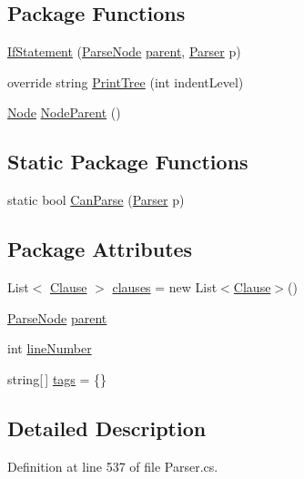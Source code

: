 \subsection*{Package Functions}
\begin{DoxyCompactItemize}
\item 
\hyperlink{a00118_ae534078389e8663edf7660403acf3cbc}{If\-Statement} (\hyperlink{a00148}{Parse\-Node} \hyperlink{a00148_af313a82103fcc2ff5a177dbb06b92f7b}{parent}, \hyperlink{a00149}{Parser} p)
\item 
override string \hyperlink{a00118_a5494c1daef8e0f3ac3ab68f91db4f332}{Print\-Tree} (int indent\-Level)
\item 
\hyperlink{a00138}{Node} \hyperlink{a00148_a580e520a29444fc23ac3660cbe514a09}{Node\-Parent} ()
\end{DoxyCompactItemize}
\subsection*{Static Package Functions}
\begin{DoxyCompactItemize}
\item 
static bool \hyperlink{a00118_afd6b96e1a27872701c4e6832f17fc3ce}{Can\-Parse} (\hyperlink{a00149}{Parser} p)
\end{DoxyCompactItemize}
\subsection*{Package Attributes}
\begin{DoxyCompactItemize}
\item 
List$<$ \hyperlink{a00050}{Clause} $>$ \hyperlink{a00118_a679b1a21582c78ed06df36bccc9c3cbc}{clauses} = new List$<$\hyperlink{a00050}{Clause}$>$()
\item 
\hyperlink{a00148}{Parse\-Node} \hyperlink{a00148_af313a82103fcc2ff5a177dbb06b92f7b}{parent}
\item 
int \hyperlink{a00148_a18b493382de0fde5b4299c1bd2250075}{line\-Number}
\item 
string\mbox{[}$\,$\mbox{]} \hyperlink{a00148_a58b3a15788fd2d4127d73619dc6d04ae}{tags} = \{\}
\end{DoxyCompactItemize}


\subsection{Detailed Description}


Definition at line 537 of file Parser.\-cs.




